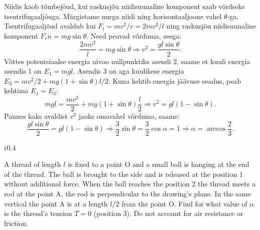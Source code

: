 {\ifSolution
Niidis kaob tõmbejõud, kui raskusjõu niidisuunaline komponent saab võrdseks tsentrifugaaljõuga. Märgistame nurga niidi ning horisontaaljoone vahel $\theta$-ga. Tsentrifugaaljõud avaldub kui $F_t=mv^2/r=2mv^2/l$ ning raskusjõu niidisuunaline komponent $F_rn=mg\sin\theta$. Need peavad võrduma, seega:
$$\frac{2mv^2}{l}=mg\sin\theta \Rightarrow v^2=\frac{gl\sin\theta}{2}.$$
Võttes potentsiaalse energia nivoo nullpunktiks asendi 2, saame et kuuli energia asendis 1 on $E_1=mgl$. Asendis 3 on aga kuulikese energia $E_3=mv^2/2+mg(1+\sin\theta)l/2$. Kuna kehtib energia jäävuse seadus, peab kehtima $E_1=E_3$:
$$mgl=\frac{mv^2}{2}+mg(1+\sin\theta)\frac{l}{2} \Rightarrow v^2=gl(1-\sin\theta).$$
Pannes kaks avaldist $v^2$ jaoks omavahel võrduma, saame:
$$\frac{gl\sin\theta}{2}=gl(1-\sin\theta)\Rightarrow \frac{3}{2}\sin\theta=\frac{3}{2}\cos\alpha=1 \Rightarrow \alpha=\arccos\frac{2}{3}.$$
\fi


\ifEngStatement
\begin{wrapfigure}[10]{r}{0.4\textwidth}
\vspace{-5pt}
\end{wrapfigure}
A thread of length $l$ is fixed to a point O and a small ball is hanging at the end of the thread. The ball is brought to the side and is released at the position 1 without additional force. When the ball reaches the position 2 the thread meets a rod at the point A, the rod is perpendicular to the drawing’s plane. In the same vertical the point A is at a length $l/2$ from the point O. Find for what value of $\alpha$ is the thread’s tension $T=0$ (position 3). Do not account for air resistance or friction.
\fi


}
